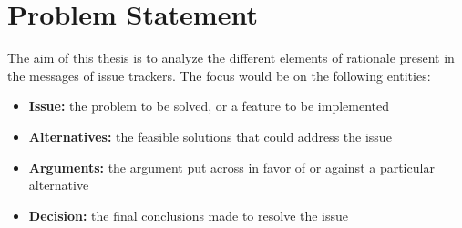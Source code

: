 \documentclass[dvips,12pt]{article}
\begin{document}
\section{Problem Statement}

The aim of this thesis is to analyze the different elements of rationale present in the messages of issue trackers. The focus would be on the following entities:
\begin{itemize}
\item \textbf{Issue:} the problem to be solved, or a feature to be implemented
\item \textbf{Alternatives:} the feasible solutions that could address the issue
\item \textbf{Arguments:} the argument put across in favor of or against a particular alternative
\item \textbf{Decision:} the final conclusions made to resolve the issue
\end{itemize}
\end{document}

